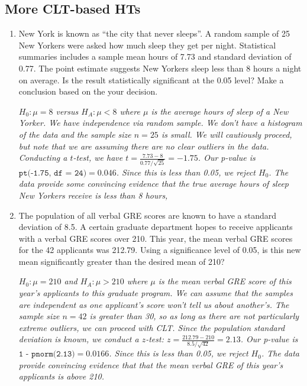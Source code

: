 \documentclass[12pt]{article}   	%
\newcommand{\soln}[2]{\textit{\textcolor{custom_red}{#2}}}{}
\begin{document}
\subsection*{More CLT-based HTs}

\begin{enumerate}

\item
  New York is known as ``the city that never sleeps''. A random sample
  of 25 New Yorkers were asked how much sleep they get per night.
  Statistical summaries includes a sample mean hours of 7.73 and
  standard deviation of 0.77. The point estimate suggests New Yorkers
  sleep less than 8 hours a night on average. Is the result
  statistically significant at the 0.05 level? Make a conclusion based
  on the your decision.
  
  \soln{}{$H_{0}: \mu = 8$ versus $H_{A}: \mu < 8$ where $\mu$ is the average hours of sleep of a New Yorker. We have independence via random sample. We don't have a histogram of the data and the sample size $n=25$ is small. We will cautiously proceed, but note that we are assuming there are no clear outliers in the data. Conducting a $t$-test, we have $t = \frac{7.73 - 8}{0.77/\sqrt{25}} = -1.75$. Our p-value is $\texttt{pt(-1.75, df = 24)} = 0.046$. Since this is less than 0.05, we reject $H_0$. The data provide some convincing evidence that the true average hours of sleep New Yorkers receive is less than 8 hours,}

\item
  The population of all verbal GRE scores are known to have a standard
  deviation of 8.5. A certain graduate department hopes to receive
  applicants with a verbal GRE scores over 210. This year, the mean
  verbal GRE scores for the 42 applicants was 212.79. Using a
  significance level of 0.05, is this new mean significantly greater
  than the desired mean of 210?
  
  \soln{}{$H_{0}: \mu = 210$ and $H_{A}: \mu > 210$ where $\mu$ is the mean verbal GRE score of this year's applicants to this graduate program. We can assume that the samples are independent as one applicant's score won't tell us about another's. The sample size $ n = 42$ is greater than 30, so as long as there are not particularly extreme outliers, we can proceed with CLT. Since the population standard deviation is known, we conduct a $z$-test: $z = \frac{212.79 - 210}{8.5/\sqrt{42}} = 2.13$. Our p-value is $\texttt{1 - pnorm(2.13)} = 0.0166$. Since this is less than 0.05, we reject $H_{0}$. The data provide convincing evidence that that the mean verbal GRE of this year's applicants is above 210.}
\end{enumerate}
\end{document}
